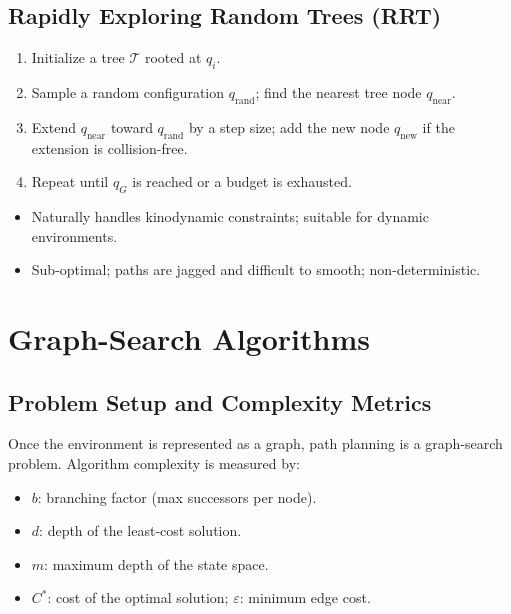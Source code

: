 \documentclass[11pt,a4paper]{article}
\theoremstyle{definition}
\theoremstyle{plain}
\theoremstyle{remark}
\begin{document}
\subsection{Rapidly Exploring Random Trees (RRT)}

\begin{enumerate}
    \item Initialize a tree $\mathcal{T}$ rooted at $q_i$.
    \item Sample a random configuration $q_{\mathrm{rand}}$; find the nearest tree node $q_{\mathrm{near}}$.
    \item Extend $q_{\mathrm{near}}$ toward $q_{\mathrm{rand}}$ by a step size; add the new node $q_{\mathrm{new}}$ if the extension is collision-free.
    \item Repeat until $q_G$ is reached or a budget is exhausted.
\end{enumerate}

\begin{itemize}
    \item[\textbf{+}] Naturally handles kinodynamic constraints; suitable for dynamic environments.
    \item[\textbf{--}] Sub-optimal; paths are jagged and difficult to smooth; non-deterministic.
\end{itemize}

\section{Graph-Search Algorithms}

\subsection{Problem Setup and Complexity Metrics}

Once the environment is represented as a graph, path planning is a graph-search problem. Algorithm complexity is measured by:
\begin{itemize}
    \item $b$: branching factor (max successors per node).
    \item $d$: depth of the least-cost solution.
    \item $m$: maximum depth of the state space.
    \item $C^*$: cost of the optimal solution; $\varepsilon$: minimum edge cost.
\end{itemize}
\end{document}
